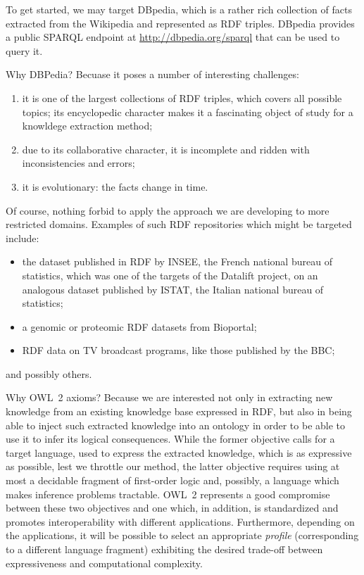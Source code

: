 \documentclass[a4paper]{article}
\newcounter{ex}
\begin{document}
To get started, we may target DBpedia, which is a rather rich collection of
facts extracted from the Wikipedia and represented as RDF triples.
DBpedia provides a public SPARQL endpoint  at \url{http://dbpedia.org/sparql}
that can be used to query it.

Why DBPedia?
Becuase it poses a number of interesting challenges:
\begin{enumerate}
\item it is one of the largest collections of RDF triples, which covers all possible
  topics; its encyclopedic character makes it a fascinating object of study for a
  knowldege extraction method;
\item due to its collaborative character, it is incomplete and ridden with inconsistencies
  and errors;
\item it is evolutionary: the facts change in time.
\end{enumerate}
Of course, nothing forbid to apply the approach we are developing to more restricted
domains. Examples of such RDF repositories which might be targeted include:
\begin{itemize}
\item the dataset published in RDF by INSEE, the French national bureau of statistics,
  which was one of the targets of the Datalift project, on an analogous dataset
  published by ISTAT, the Italian national bureau of statistics;
\item a genomic or proteomic RDF datasets from Bioportal;
\item RDF data on TV broadcast programs, like those published by the BBC;
\end{itemize}
and possibly others.

Why OWL~2 axioms?
Because we are interested not only in extracting new knowledge from an existing knowledge
base expressed in RDF, but also in being able to inject such extracted knowledge into
an ontology in order to be able to use it to infer its logical consequences.
While the former objective calls for a target language, used to express the extracted
knowledge, which is as expressive as possible, lest we throttle our method,
the latter objective requires using at most a decidable fragment of first-order logic
and, possibly, a language which makes inference problems tractable.
OWL~2 represents a good compromise between these two objectives and one which, in addition,
is standardized and promotes interoperability with different applications.
Furthermore, depending on the applications, it will be possible to select an appropriate
\emph{profile} (corresponding to a different language fragment) exhibiting the
desired trade-off between expressiveness and computational complexity.
\end{document}
